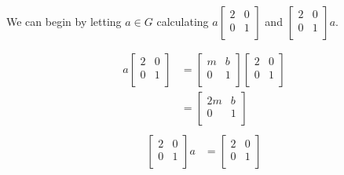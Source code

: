 \begin{mdframed}[style=darkAnswer,frametitle={Joe Starr}]
  We can begin by letting $a\in G$ calculating $a\begin{bmatrix}
  2 & 0 \\
  0 & 1 \\
  \end{bmatrix}$ and $\begin{bmatrix}
  2 & 0 \\
  0 & 1 \\
  \end{bmatrix}a$.
  \begin{multicols}{2}
    \begin{align*}
      a\begin{bmatrix}
      2             & 0                 \\
      0             & 1                 \\
      \end{bmatrix} & = \begin{bmatrix} 
      m             & b                 \\
      0             & 1                 \\
      \end{bmatrix} \begin{bmatrix}
      2             & 0                 \\
      0             & 1                 \\
      \end{bmatrix} \\
                    & = \begin{bmatrix} 
      2m            & b                 \\
      0             & 1                 \\
      \end{bmatrix}                            \\
    \end{align*}
    \begin{align*}
      \begin{bmatrix}
      2              & 0                  \\
      0              & 1                  \\
      \end{bmatrix}a & =  \begin{bmatrix} 
      2              & 0                  \\
      0              & 1                  \\

\end{bmatrix}
\end{align*}
\end{multicols}
\end{mdframed}
